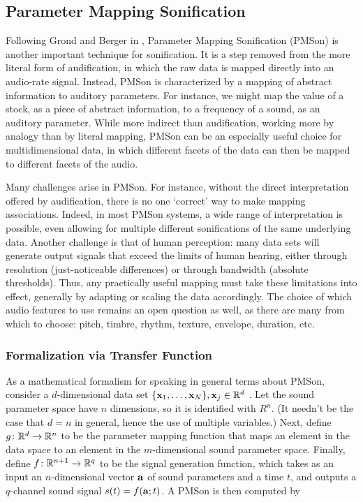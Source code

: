 \subsection{Parameter Mapping Sonification}
\label{sec:PMSon}
Following Grond and Berger in \cite{hermann2011sonification}, Parameter Mapping Sonification (PMSon) is another important technique for 
sonification. It is a step removed from the more literal form of 
audification, in which the raw data is mapped directly into an audio-rate 
signal. Instead, PMSon is characterized by a mapping of abstract information 
to auditory parameters. For instance, we might map the value of a stock, as a 
piece of abstract information, to a frequency of a sound, as an auditory 
parameter. While more indirect than audification, working more by analogy 
than by literal mapping, PMSon can be an especially useful choice for 
multidimensional data, in which different facets of the data can then be 
mapped to different facets of the audio.

Many challenges arise in PMSon. For instance, without the direct 
interpretation offered by audification, there is no one `correct' way to make 
mapping associations. Indeed, in most PMSon systems, a wide range of 
interpretation is possible, even allowing for multiple different 
sonifications of the same underlying data. Another challenge is that of human 
perception: many data sets will generate output signals that exceed the 
limits of human hearing, either through resolution (just-noticeable 
differences) or through bandwidth (absolute thresholds). Thus, any 
practically useful mapping must take these limitations into effect, generally 
by adapting or scaling the data accordingly. The choice of which audio 
features to use remains an open question as well, as there are many from 
which to choose: pitch, timbre, rhythm, texture, envelope, duration, etc. 

\subsubsection{Formalization via Transfer Function}
As a mathematical formalism for speaking in general terms about PMSon, 
consider a $d$-dimensional data set $\{\mathbf{x}_1, \dots, \mathbf{x}_N\}, \mathbf{x}_j \in \mathbb{R}^d$
. Let the sound parameter space have $n$ dimensions, so it is identified with 
$R^n$. (It needn't be the case that $d = n$ in general, hence the use of 
multiple variables.) Next, define $g \colon \mathbb{R}^d \rightarrow \mathbb{R}^n$ to be the 
parameter mapping function that maps an element in the data space to an 
element in the $m$-dimensional sound parameter space.  Finally, define $f 
\colon \mathbb{R}^{n + 1} \rightarrow \mathbb{R}^q$ to be the signal generation function, 
which takes as an input an $n$-dimensional vector $\mathbf{a}$ of sound parameters 
and a time $t$, and outputs a $q$-channel sound signal $s(t) = f(\mathbf{a}; t)$. A 
PMSon is then computed by


